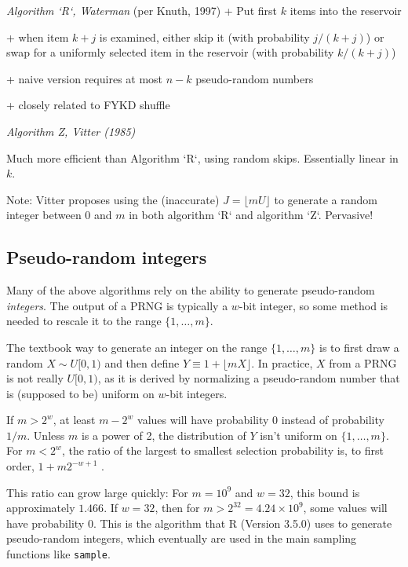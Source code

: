 \documentclass[graybox]{svmult}
\begin{document}
\emph{ Algorithm `R`, Waterman} (per Knuth, 1997)
+ Put first $k$ items into the reservoir

+ when item $k+j$ is examined, either skip it (with probability $j/(k+j)$) or swap for a uniformly selected item in the reservoir (with probability $k/(k+j)$)

+ naive version requires at most $n-k$ pseudo-random numbers

+ closely related to FYKD shuffle

\emph{ Algorithm Z, Vitter (1985)}

Much more efficient than Algorithm `R`, using random skips. Essentially linear in $k$. 

Note: Vitter proposes using the (inaccurate) $J = \lfloor mU \rfloor$ to generate a random integer between $0$ and $m$ in both algorithm `R` and algorithm `Z`. Pervasive!


\subsection{Pseudo-random integers}
\label{sec:integers}
Many of the above algorithms rely on the ability to generate pseudo-random \emph{integers}.
The output of a PRNG is typically a $w$-bit integer, so some method is needed to rescale it to the range $\{1, \ldots, m\}$.

The textbook way to generate an integer on the range $\{1, \ldots, m\}$ is to first draw a random $X \sim U[0,1)$
and then define $Y \equiv 1 + \lfloor mX \rfloor$. 
In practice, $X$ from a PRNG is not really $U[0,1)$, as it is derived by normalizing a pseudo-random number that is
 (supposed to be) uniform on $w$-bit integers. 

If $m > 2^w$, at least $m-2^w$ values will have probability 0 instead of probability $1/m$.
Unless $m$ is a power of 2, the distribution of $Y$ isn't uniform on $\{1, \ldots, m\}$. 
For $m < 2^w$, the ratio of the largest to smallest selection probability is, to first order,  $1+ m 2^{-w+1}$ \cite{knuth_art_1997}.

This ratio can grow large quickly: For $m = 10^9$ and $w=32$, this bound is approximately $1.466$. 
If $w=32$, then for $m>2^{32}=4.24 \times 10^9$, some values will have probability 0. 
This is the algorithm that R (Version 3.5.0) \cite{R_2018} uses to generate pseudo-random integers,
which eventually are used in the main sampling functions like \texttt{sample}.
    
\end{document}
